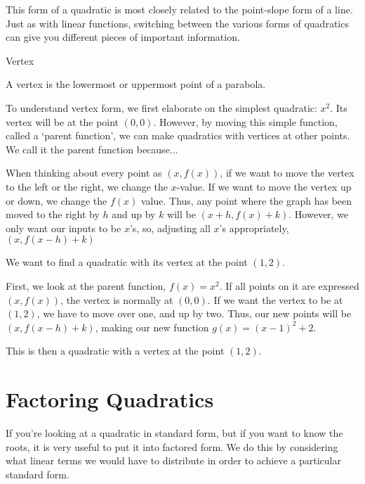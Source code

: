 This form of a quadratic is most closely related to the point-slope form of a line.  Just as with linear functions, switching between the various forms of quadratics can give you different pieces of important information.

\begin{defn} Vertex

A vertex is the lowermost or uppermost point of a parabola.
\end{defn}

To understand vertex form, we first elaborate on the simplest quadratic: $x^2$.  Its vertex will be at the point $(0,0)$.  However, by moving this simple function, called a `parent function', we can make quadratics with vertices at other points.  We call it the parent function because...

When thinking about every point as $(x, f(x))$, if we want to move the vertex to the left or the right, we change the $x$-value.  If we want to move the vertex up or down, we change the $f(x)$ value.  Thus, any point where the graph has been moved to the right by $h$ and up by $k$ will be $(x + h, f(x) + k)$.  However, we only want our inputs to be $x$'s, so, adjusting all $x$'s appropriately, $(x, f(x-h)+k)$

\begin{example}

We want to find a quadratic with its vertex at the point $(1,2)$.

First, we look at the parent function, $f(x) = x^2$.  If all points on it are expressed $(x, f(x))$, the vertex is normally at $(0,0)$.  If we want the vertex to be at $(1,2)$, we have to move over one, and up by two.  Thus, our new points will be $(x, f(x-h)+k)$, making our new function $g(x) = (x-1)^2 + 2$.

This is then a quadratic with a vertex at the point $(1,2)$.

\end{example}

\section*{Factoring Quadratics}

If you're looking at a quadratic in standard form, but if you want to know the roots, it is very useful to put it into factored form.  We do this by considering what linear terms we would have to distribute in order to achieve a particular standard form.

